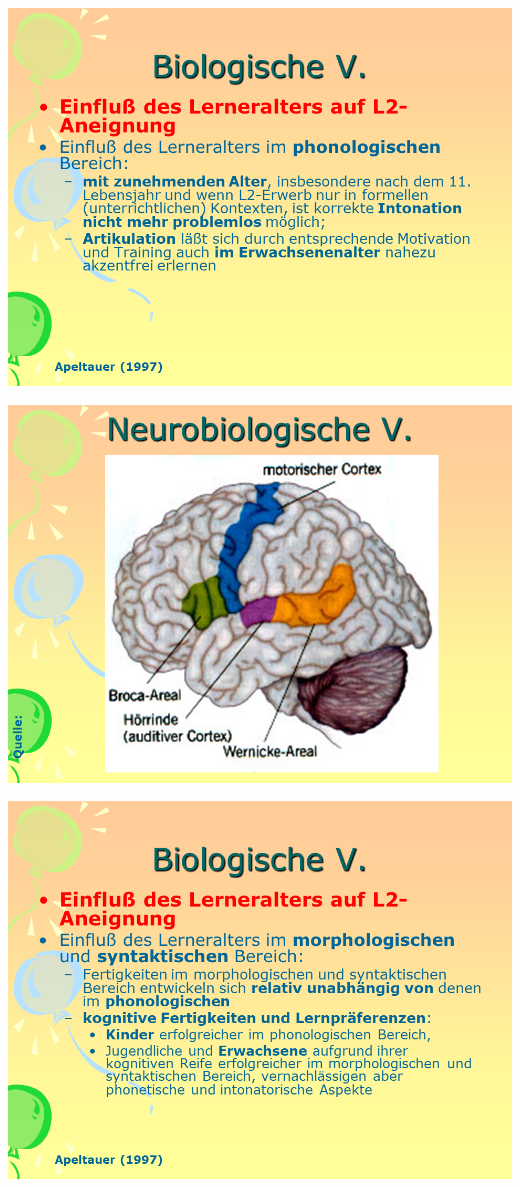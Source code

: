 \documentclass[
  letterpaper,
]{scrbook}
\begin{document}
\includegraphics[width=1\textwidth,height=\textheight]{./pictures/neuro/Diapozitiv78.PNG}

\includegraphics[width=1\textwidth,height=\textheight]{./pictures/neuro/Diapozitiv79.PNG}

\includegraphics[width=1\textwidth,height=\textheight]{./pictures/neuro/Diapozitiv80.PNG}
\end{document}
